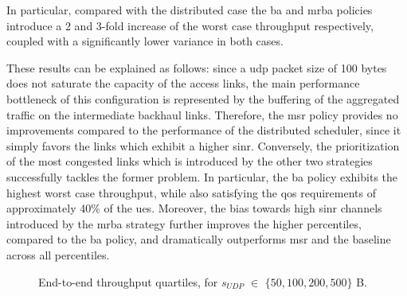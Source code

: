 In particular, compared with the distributed case the \gls{ba} and \gls{mrba} policies introduce a 2 and 3-fold increase of the worst case throughput respectively, coupled with a significantly lower variance in both cases. 

These results can be explained as follows: since a \gls{udp} packet size of 100 bytes does not saturate the capacity of the access links, the main performance bottleneck of this configuration is represented by the buffering of the aggregated traffic on the intermediate backhaul links. Therefore, the \gls{msr} policy provides no improvements compared to the performance of the distributed scheduler, since it simply favors the links which exhibit a higher \gls{sinr}. Conversely, the prioritization of the most congested links which is introduced by the other two strategies successfully tackles the former problem. 
In particular, the \gls{ba} policy exhibits the highest worst case throughput, while also satisfying the \gls{qos} requirements of approximately 40\% of the \glspl{ue}. Moreover, the bias towards high \gls{sinr} channels introduced by the \gls{mrba} strategy further improves the higher percentiles, compared to the \gls{ba} policy, and dramatically outperforms \gls{msr} and the baseline across all percentiles. 
\begin{figure}[tbp]
  \centering
  \hfill
{}
   \caption{End-to-end throughput quartiles, for $s_{UDP}$ $\in$ $\{50, 100, 200, 500 \}$ B.}
  \label{Fig:Throughput_quartiles}
  \vspace{-.6cm} 
\end{figure}

